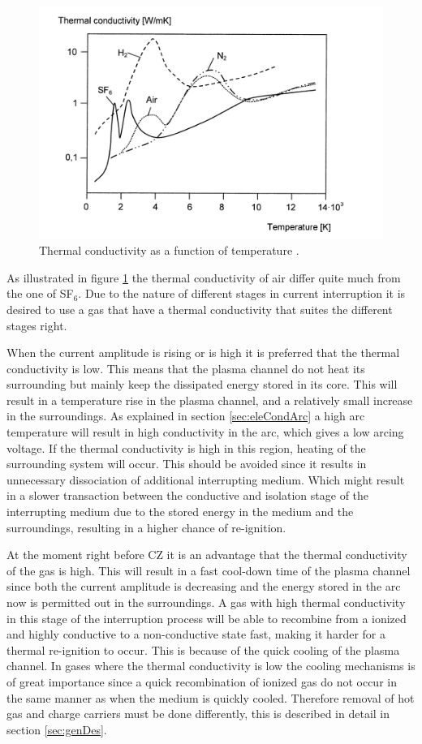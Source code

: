 \documentclass[10pt,a4paper,twoside]{article}
\begin{document}
\begin{figure}[H]
\centering
\includegraphics[scale=0.8]{Bilder/Theory/thermalCond.png}
\caption{Thermal conductivity as a function of temperature \cite{bib:HVEbreak}.} \label{fig:tempConGas}
\end{figure}

As illustrated in figure \ref{fig:tempConGas} the thermal conductivity of air differ quite much from the one of SF$_6$. Due to the nature of different stages in current interruption it is desired to use a gas that have a thermal conductivity that suites the different stages right. 

When the current amplitude is rising or is high it is preferred that the thermal conductivity is low. This means that the plasma channel do not heat its surrounding but mainly keep the dissipated energy stored in its core. This will result in a temperature rise in the plasma channel, and a relatively small increase in the surroundings. As explained in section \ref{sec:eleCondArc} a high arc temperature will result in high conductivity in the arc, which gives a low arcing voltage. If the thermal conductivity is high in this region, heating of the surrounding system will occur. This should be avoided since it results in unnecessary dissociation of additional interrupting medium. Which might result in a slower transaction between the conductive and isolation stage of the interrupting medium due to the stored energy in the medium and the surroundings, resulting in a higher chance of re-ignition.

At the moment right before CZ it is an advantage that the thermal conductivity of the gas is high. This will result in a fast cool-down time of the plasma channel since both the current amplitude is decreasing and the energy stored in the arc now is permitted out in the surroundings. A gas with high thermal conductivity in this stage of the interruption process will be able to recombine from a ionized and highly conductive to a non-conductive state fast, making it harder for a thermal re-ignition to occur. This is because of the quick cooling of the plasma channel. In gases where the thermal conductivity is low the cooling mechanisms is of great importance since a quick recombination of ionized gas do not occur in the same manner as when the medium is quickly cooled. Therefore removal of hot gas and charge carriers must be done differently, this is described in detail in section \ref{sec:genDes}.
\end{document}
